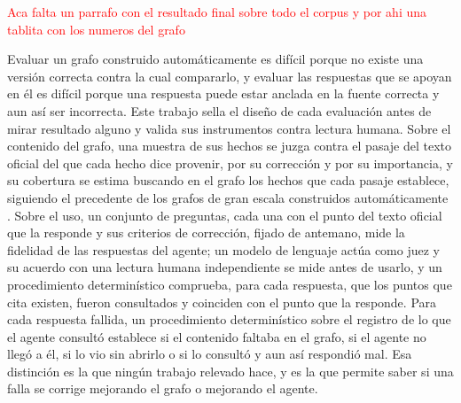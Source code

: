 \documentclass[12pt,a4paper]{report}
\begin{document}
\textcolor{red}{Aca falta un parrafo con el resultado final sobre todo el corpus y por ahi una tablita con los numeros del grafo}



Evaluar un grafo construido automáticamente es difícil porque no existe una versión correcta contra la cual compararlo, y evaluar las respuestas que se apoyan en él es difícil porque una respuesta puede estar anclada en la fuente correcta y aun así ser incorrecta. Este trabajo sella el diseño de cada evaluación antes de mirar resultado alguno y valida sus instrumentos contra lectura humana. Sobre el contenido del grafo, una muestra de sus hechos se juzga contra el pasaje del texto oficial del que cada hecho dice provenir, por su corrección y por su importancia, y su cobertura se estima buscando en el grafo los hechos que cada pasaje establece, siguiendo el precedente de los grafos de gran escala construidos automáticamente \cite{suchanek2007yago}. Sobre el uso, un conjunto de preguntas, cada una con el punto del texto oficial que la responde y sus criterios de corrección, fijado de antemano, mide la fidelidad de las respuestas del agente; un modelo de lenguaje actúa como juez y su acuerdo con una lectura humana independiente se mide antes de usarlo, y un procedimiento determinístico comprueba, para cada respuesta, que los puntos que cita existen, fueron consultados y coinciden con el punto que la responde. Para cada respuesta fallida, un procedimiento determinístico sobre el registro de lo que el agente consultó establece si el contenido faltaba en el grafo, si el agente no llegó a él, si lo vio sin abrirlo o si lo consultó y aun así respondió mal. Esa distinción es la que ningún trabajo relevado hace, y es la que permite saber si una falla se corrige mejorando el grafo o mejorando el agente.
\end{document}
